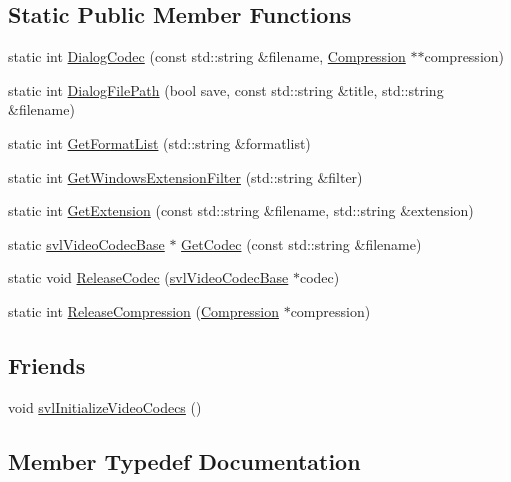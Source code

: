 \subsection*{Static Public Member Functions}
\begin{DoxyCompactItemize}
\item 
static int \hyperlink{classsvl_video_i_o_aafee8df80c7830e8af4801d150799f87}{Dialog\+Codec} (const std\+::string \&filename, \hyperlink{classsvl_video_i_o_a932d071ec9be4fefde824ab9b9125282}{Compression} $\ast$$\ast$compression)
\item 
static int \hyperlink{classsvl_video_i_o_a18e44abea35da502f090ac595d04e30e}{Dialog\+File\+Path} (bool save, const std\+::string \&title, std\+::string \&filename)
\item 
static int \hyperlink{classsvl_video_i_o_aca352855266bbea4ea91f373dfe18a3d}{Get\+Format\+List} (std\+::string \&formatlist)
\item 
static int \hyperlink{classsvl_video_i_o_a8c47774e2f28ce0dbcf84092e5b79387}{Get\+Windows\+Extension\+Filter} (std\+::string \&filter)
\item 
static int \hyperlink{classsvl_video_i_o_afdf17eb75f0134fd6a2c76bd63dcd92e}{Get\+Extension} (const std\+::string \&filename, std\+::string \&extension)
\item 
static \hyperlink{classsvl_video_codec_base}{svl\+Video\+Codec\+Base} $\ast$ \hyperlink{classsvl_video_i_o_a4d73c788b036ed84b2ff64908bfc7824}{Get\+Codec} (const std\+::string \&filename)
\item 
static void \hyperlink{classsvl_video_i_o_a7963cfd278c6270427de8360d53c828b}{Release\+Codec} (\hyperlink{classsvl_video_codec_base}{svl\+Video\+Codec\+Base} $\ast$codec)
\item 
static int \hyperlink{classsvl_video_i_o_a8f7f857fa7d45c9ea24b1d632c9bb4f9}{Release\+Compression} (\hyperlink{classsvl_video_i_o_a932d071ec9be4fefde824ab9b9125282}{Compression} $\ast$compression)
\end{DoxyCompactItemize}
\subsection*{Friends}
\begin{DoxyCompactItemize}
\item 
void \hyperlink{classsvl_video_i_o_a56ef4f6bb06b1dd81e565ac7bc110cbf}{svl\+Initialize\+Video\+Codecs} ()
\end{DoxyCompactItemize}


\subsection{Member Typedef Documentation}
\hypertarget{classsvl_video_i_o_a932d071ec9be4fefde824ab9b9125282}{}
